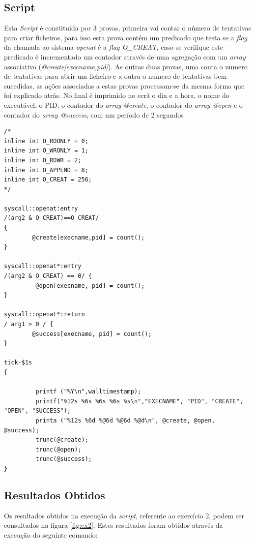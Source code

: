 \documentclass[conference,compsoc]{IEEEtran}
\begin{document}
\subsection{Script}

Esta \textit{Script} é constituida por 3 provas,  primeira vai contar o número de tentativas para criar ficheiros, para isso esta prova contém um predicado que testa se a \textit{flag} da chamada ao sistema \textit{openat} é a \textit{flag O\_CREAT}, caso se verifique este predicado é incrementado um contador através de uma agregação com um \textit{array} associativo (\textit{@create[execname,pid]}). As outras duas provas, uma conta o numero de tentativas para abrir um ficheiro e a outra o numero de tentativas bem sucedidas, as ações associadas a estas provas processam-se da mesma forma que foi explicado atrás. No final é imprimido no ecrã o dia e a hora, o nome do executável, o PID, o contador do \textit{array @create}, o contador do \textit{array @open} e o contador do \textit{array @success}, com um período de 2 segundos

\begin{lstlisting}
/* 
inline int O_RDONLY = 0;
inline int O_WRONLY = 1;
inline int O_RDWR = 2;
inline int O_APPEND = 8;
inline int O_CREAT = 256;
*/

syscall::openat:entry
/(arg2 & O_CREAT)==O_CREAT/
{       
        @create[execname,pid] = count();
}

syscall::openat*:entry
/(arg2 & O_CREAT) == 0/ {
         @open[execname, pid] = count();
}
 
syscall::openat*:return
/ arg1 > 0 / {
        @success[execname, pid] = count();
}

tick-$1s
{       
         
         printf ("%Y\n",walltimestamp);
         printf("%12s %6s %6s %6s %s\n","EXECNAME", "PID", "CREATE", "OPEN", "SUCCESS");
         printa ("%12s %6d %@6d %@6d %@d\n", @create, @open, @success);
         trunc(@create);
         trunc(@open); 
         trunc(@success);
}
\end{lstlisting}

\subsection{Resultados Obtidos}

Os resultados obtidos na execução da \textit{script}, referente ao exercício 2, podem ser consultados na figura \ref{fig:ex2}. Estes resultados foram obtidos através da execução do seguinte comando:
\end{document}
